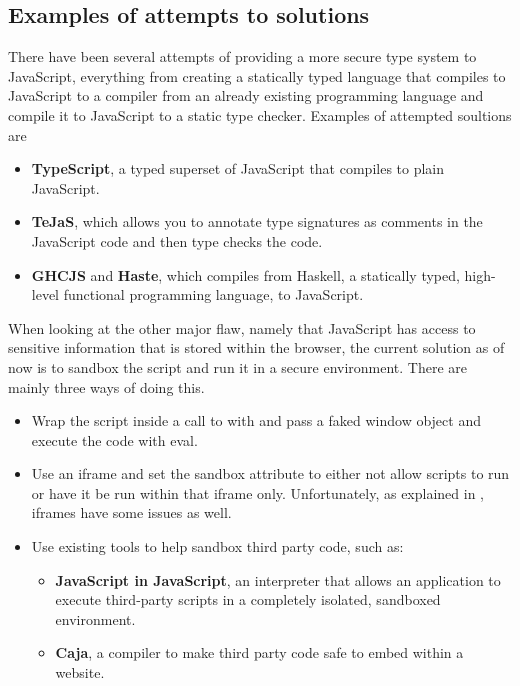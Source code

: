\subsection{Examples of attempts to solutions}
There have been several attempts of providing a more secure type system to JavaScript, everything from creating a statically typed language that compiles to JavaScript to a compiler from an already existing programming language and compile it to JavaScript to a static type checker. Examples of attempted soultions are
\begin{itemize}
  \item \textbf{TypeScript}\cite{typescript}, a typed superset of JavaScript that compiles to plain JavaScript.
  \item \textbf{TeJaS}\cite{tejas-art,tejas-git}, which allows you to annotate type signatures as comments in the JavaScript code and then type checks the code.
  \item \textbf{GHCJS}\cite{ghcjs} and \textbf{Haste}\cite{haste-lang,haste-symposium}, which compiles from Haskell, a statically typed, high-level functional programming language\cite{haskell}, to JavaScript.
\end{itemize}

When looking at the other major flaw, namely that JavaScript has access to sensitive information that is stored within the browser, the current solution as of now is to sandbox the script and run it in a secure environment. There are mainly three ways of doing this.
\begin{itemize}
  \item Wrap the script inside a call to with and pass a faked window object and execute the code with eval.
  \item Use an iframe and set the sandbox attribute to either not allow scripts to run or have it be run within that iframe only. Unfortunately, as explained in \cite{js_in_js}, iframes have some issues as well.
  \item Use existing tools to help sandbox third party code, such as:
    \begin{itemize}
      \item \textbf{JavaScript in JavaScript}\cite{js_in_js}, an interpreter that allows an application to execute third-party scripts in a completely isolated, sandboxed environment.
      \item \textbf{Caja}\cite{caja_spec}, a compiler to make third party code safe to embed within a website.
    \end{itemize}
\end{itemize}
